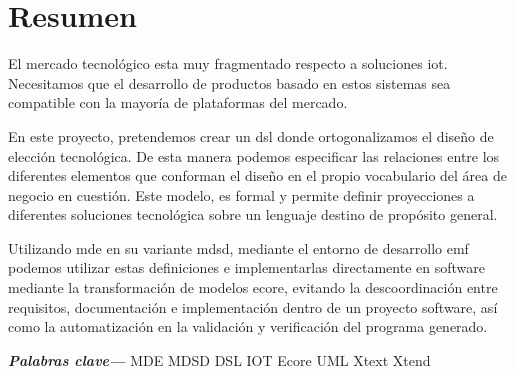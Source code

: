 \chapter*{Resumen}

\glsresetall

El mercado tecnológico esta muy fragmentado respecto a soluciones \gls{iot}. Necesitamos que el desarrollo de productos basado en estos sistemas sea compatible con
la mayoría de plataformas del mercado.

En este proyecto, pretendemos crear un \gls{dsl} donde ortogonalizamos el diseño de elección tecnológica. De esta
manera podemos especificar las relaciones entre los diferentes elementos que conforman
el diseño en el propio vocabulario del área de negocio en cuestión. Este
modelo, es formal y permite definir proyecciones a diferentes soluciones tecnológica sobre un lenguaje destino de propósito general.

Utilizando \gls{mde} en su variante \gls{mdsd}, mediante el entorno de desarrollo \gls{emf} podemos utilizar estas definiciones e implementarlas directamente
en software mediante la transformación de modelos \gls{ecore}, evitando la descoordinación entre requisitos, documentación e implementación dentro de un proyecto software, así como la automatización en la validación y verificación del programa generado.


\textbf{\textit{Palabras clave---}} MDE MDSD DSL IOT Ecore UML Xtext Xtend


